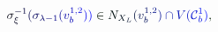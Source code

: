 \documentclass[12pt]{article}
\begin{document}
\makeatletter
\renewcommand*{\@textcolor}[3]{%
  \protect\leavevmode
  \begingroup
    \color#1{#2}#3%
  \endgroup
}
\makeatother
\begin{displaymath}
\mathcolor[RGB]{0,0,15}{\sigma} _ { \mathcolor[RGB]{0,0,30}{\xi} } ^ { \mathcolor[RGB]{0,0,45}{-} \mathcolor[RGB]{0,0,60}{1} } \mathcolor[RGB]{0,0,75}{(} \mathcolor[RGB]{0,0,90}{\sigma} _ { \mathcolor[RGB]{0,0,105}{\lambda} \mathcolor[RGB]{0,0,120}{-} \mathcolor[RGB]{0,0,135}{1} } \mathcolor[RGB]{0,0,150}{(} \mathcolor[RGB]{0,0,165}{v} _ { \mathcolor[RGB]{0,0,180}{b} } ^ { \mathcolor[RGB]{0,0,195}{1} \mathcolor[RGB]{0,0,210}{,} \mathcolor[RGB]{0,0,225}{2} } \mathcolor[RGB]{0,0,240}{)} \mathcolor[RGB]{0,0,255}{)} \mathcolor[RGB]{0,15,0}{\in} \mathcolor[RGB]{0,15,15}{N} _ { \mathcolor[RGB]{0,15,30}{X} _ { \mathcolor[RGB]{0,15,45}{L} } } \mathcolor[RGB]{0,15,60}{(} \mathcolor[RGB]{0,15,75}{v} _ { \mathcolor[RGB]{0,15,90}{b} } ^ { \mathcolor[RGB]{0,15,105}{1} \mathcolor[RGB]{0,15,120}{,} \mathcolor[RGB]{0,15,135}{2} } \mathcolor[RGB]{0,15,150}{)} \mathcolor[RGB]{0,15,165}{\cap} \mathcolor[RGB]{0,15,180}{V} \mathcolor[RGB]{0,15,195}{(} \mathcal { \mathcolor[RGB]{0,15,210}{C} } _ { \mathcolor[RGB]{0,15,225}{b} } ^ { \mathcolor[RGB]{0,15,240}{1} } \mathcolor[RGB]{0,15,255}{)} \mathcolor[RGB]{0,30,0}{,}
\end{displaymath}
\end{document}
